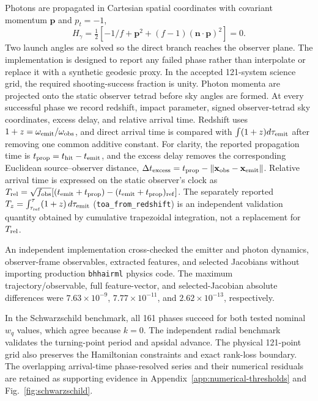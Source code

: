 \documentclass[11pt]{article}
\newcommand{\wq}{w_q}
\begin{document}
Photons are propagated in Cartesian spatial coordinates with covariant momentum
$\mathbf p$ and $p_t=-1$,
\begin{equation}
 H_\gamma=\tfrac12[-1/f+\mathbf p^2+(f-1)(\mathbf n\!\cdot\!\mathbf p)^2]=0.
\end{equation}
Two launch angles are solved so the direct branch reaches the observer plane.
The implementation is designed to report any failed phase rather than
interpolate or replace it with a synthetic geodesic proxy. In the accepted
121-system science grid, the required shooting-success fraction is unity.
Photon momenta are projected onto the
static observer tetrad before sky angles are formed. At every successful phase
we record redshift, impact parameter, signed
observer-tetrad sky coordinates, excess delay, and relative arrival time.
Redshift uses
$1+z=\omega_{\rm emit}/\omega_{\rm obs}$, and direct arrival time is compared
with $\int(1+z)d\tau_{\rm emit}$ after removing one common additive constant.
For clarity, the reported propagation time is
$t_{\rm prop}=t_{\rm hit}-t_{\rm emit}$, and the excess delay removes the
corresponding Euclidean source--observer distance,
$\Delta t_{\rm excess}=t_{\rm prop}-\lVert\mathbf{x}_{\rm obs}-
\mathbf{x}_{\rm emit}\rVert$.  Relative arrival time is expressed on the
static observer's clock as
$T_{\rm rel}=\sqrt{f_{\rm obs}}[(t_{\rm emit}+t_{\rm prop})-
(t_{\rm emit}+t_{\rm prop})_{\rm ref}]$.  The separately reported
$T_z=\int_{\tau_{\rm ref}}^{\tau}(1+z)\,d\tau_{\rm emit}$
(\texttt{toa\_from\_redshift}) is an independent validation quantity obtained
by cumulative trapezoidal integration, not a replacement for $T_{\rm rel}$.

An independent implementation cross-checked the emitter and photon dynamics,
observer-frame observables, extracted features, and selected Jacobians without
importing production \texttt{bhhairml} physics code. The maximum
trajectory/observable, full feature-vector, and selected-Jacobian absolute
differences were $7.63\times10^{-9}$, $7.77\times10^{-11}$, and
$2.62\times10^{-13}$, respectively.

In the Schwarzschild benchmark, all 161 phases succeed for both tested nominal
$\wq$ values, which agree because $k=0$. The independent radial benchmark
validates the turning-point period and apsidal advance. The physical 121-point
grid also preserves the Hamiltonian constraints and exact rank-loss boundary.
The overlapping arrival-time phase-resolved series and their numerical residuals are retained as
supporting evidence in Appendix~\ref{app:numerical-thresholds} and
Fig.~\ref{fig:schwarzschild}.
\end{document}
